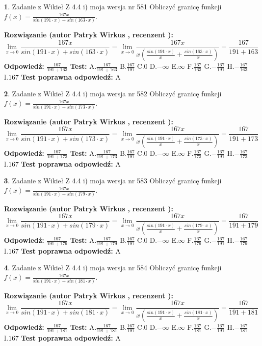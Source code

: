 \documentclass[12pt, a4paper]{article}
\theoremstyle{definition} %
\newtheorem{zad}{}
\newcommand{\zadStart}[1]{\begin{zad}#1\newline}
\newcommand{\zadStop}{\end{zad}}
\newcommand{\rozwStart}[2]{\noindent \textbf{Rozwiązanie (autor #1 , recenzent #2): }\newline}
\newcommand{\rozwStop}{\newline}
\newcommand{\odpStart}{\noindent \textbf{Odpowiedź:}\newline}
\newcommand{\odpStop}{\newline}
\newcommand{\testStart}{\noindent \textbf{Test:}\newline}
\newcommand{\testStop}{\newline}
\newcommand{\kluczStart}{\noindent \textbf{Test poprawna odpowiedź:}\newline}
\newcommand{\kluczStop}{\newline}
\begin{document}
\zadStart{Zadanie z Wikieł Z 4.4 i) moja wersja nr 581}
Obliczyć granicę funkcji $f(x)=\frac{167x}{sin(191\cdot x) +sin(163\cdot x)}$.
\zadStop
\rozwStart{Patryk Wirkus}{}
$$\lim\limits_{x\to 0}\frac{167x}{sin(191\cdot x) +sin(163\cdot x)}=\lim\limits_{x\to 0}\frac{167x}{x(\frac{sin(191\cdot x)}{x}+\frac{sin(163\cdot x)}{x})}=\frac{167}{191+163}$$
\rozwStop
\odpStart
$\frac{167}{191+163}$
\odpStop
\testStart
A.$\frac{167}{191+163}$
B.$\frac{167}{191}$
C.$0$
D.$-\infty$
E.$\infty$
F.$\frac{167}{163}$
G.$-\frac{167}{191}$
H.$-\frac{167}{163}$
I.$167$
\testStop
\kluczStart
A
\kluczStop



\zadStart{Zadanie z Wikieł Z 4.4 i) moja wersja nr 582}
Obliczyć granicę funkcji $f(x)=\frac{167x}{sin(191\cdot x) +sin(173\cdot x)}$.
\zadStop
\rozwStart{Patryk Wirkus}{}
$$\lim\limits_{x\to 0}\frac{167x}{sin(191\cdot x) +sin(173\cdot x)}=\lim\limits_{x\to 0}\frac{167x}{x(\frac{sin(191\cdot x)}{x}+\frac{sin(173\cdot x)}{x})}=\frac{167}{191+173}$$
\rozwStop
\odpStart
$\frac{167}{191+173}$
\odpStop
\testStart
A.$\frac{167}{191+173}$
B.$\frac{167}{191}$
C.$0$
D.$-\infty$
E.$\infty$
F.$\frac{167}{173}$
G.$-\frac{167}{191}$
H.$-\frac{167}{173}$
I.$167$
\testStop
\kluczStart
A
\kluczStop



\zadStart{Zadanie z Wikieł Z 4.4 i) moja wersja nr 583}
Obliczyć granicę funkcji $f(x)=\frac{167x}{sin(191\cdot x) +sin(179\cdot x)}$.
\zadStop
\rozwStart{Patryk Wirkus}{}
$$\lim\limits_{x\to 0}\frac{167x}{sin(191\cdot x) +sin(179\cdot x)}=\lim\limits_{x\to 0}\frac{167x}{x(\frac{sin(191\cdot x)}{x}+\frac{sin(179\cdot x)}{x})}=\frac{167}{191+179}$$
\rozwStop
\odpStart
$\frac{167}{191+179}$
\odpStop
\testStart
A.$\frac{167}{191+179}$
B.$\frac{167}{191}$
C.$0$
D.$-\infty$
E.$\infty$
F.$\frac{167}{179}$
G.$-\frac{167}{191}$
H.$-\frac{167}{179}$
I.$167$
\testStop
\kluczStart
A
\kluczStop



\zadStart{Zadanie z Wikieł Z 4.4 i) moja wersja nr 584}
Obliczyć granicę funkcji $f(x)=\frac{167x}{sin(191\cdot x) +sin(181\cdot x)}$.
\zadStop
\rozwStart{Patryk Wirkus}{}
$$\lim\limits_{x\to 0}\frac{167x}{sin(191\cdot x) +sin(181\cdot x)}=\lim\limits_{x\to 0}\frac{167x}{x(\frac{sin(191\cdot x)}{x}+\frac{sin(181\cdot x)}{x})}=\frac{167}{191+181}$$
\rozwStop
\odpStart
$\frac{167}{191+181}$
\odpStop
\testStart
A.$\frac{167}{191+181}$
B.$\frac{167}{191}$
C.$0$
D.$-\infty$
E.$\infty$
F.$\frac{167}{181}$
G.$-\frac{167}{191}$
H.$-\frac{167}{181}$
I.$167$
\testStop
\kluczStart
A
\kluczStop
\end{document}
